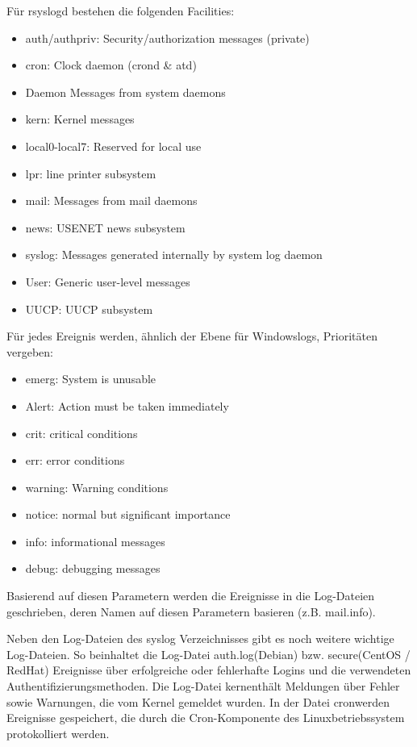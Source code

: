 Für rsyslogd bestehen die folgenden Facilities:
\begin{itemize}
\item auth/authpriv: Security/authorization messages (private)
\item cron: Clock daemon (crond \& atd)
\item Daemon Messages from system daemons
\item kern: Kernel messages
\item local0-local7: Reserved for local use
\item lpr: line printer subsystem
\item mail: Messages from mail daemons
\item news: USENET news subsystem
\item syslog: Messages generated internally by system log daemon
\item User: Generic user-level messages
\item UUCP: UUCP subsystem
\end{itemize}

Für jedes Ereignis werden, ähnlich der Ebene für Windowslogs, Prioritäten vergeben:
\begin{itemize}
\item emerg: System is unusable
\item Alert: Action must be taken immediately
\item crit: critical conditions
\item err: error conditions
\item warning: Warning conditions
\item notice: normal but significant importance
\item info: informational messages
\item debug: debugging messages
\end{itemize}

Basierend auf diesen Parametern werden die Ereignisse in die Log-Dateien geschrieben, deren Namen auf diesen Parametern basieren (z.B. \glqq mail.info\grqq ).

Neben den Log-Dateien des syslog Verzeichnisses gibt es noch weitere wichtige Log-Dateien. So beinhaltet die Log-Datei \glqq auth.log\grqq  (Debian) bzw. \glqq secure\grqq  (CentOS / RedHat) Ereignisse über erfolgreiche oder fehlerhafte Logins und die verwendeten Authentifizierungsmethoden. Die Log-Datei \glqq kern\grqq  enthält Meldungen über Fehler sowie Warnungen, die vom Kernel gemeldet wurden. In der Datei \glqq cron\grqq  werden Ereignisse gespeichert, die durch die Cron-Komponente des Linuxbetriebssystem protokolliert werden.

